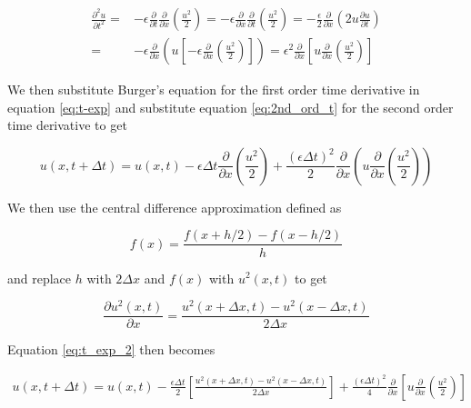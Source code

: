 \documentclass{article}
\begin{document}
\begin{equation}
\begin{split}
	\label{eq:2nd_ord_t}
	\frac{\partial^2 u }{\partial t^2} =& - \epsilon \frac{\partial }{\partial t}\frac{\partial }{\partial x} \left(\frac{u^2}{2} \right)
	= - \epsilon \frac{\partial }{\partial x}\frac{\partial }{\partial t} \left(\frac{u^2}{2} \right)
	= - \frac{\epsilon}{2} \frac{\partial }{\partial x}\left( 2u\frac{\partial u}{\partial t} \right)
	\\ =& - \epsilon \frac{\partial }{\partial x} \left( u \left[ -\epsilon \frac{\partial }{\partial x} \left(\frac{u^2}{2} \right) \right] \right)
	= \epsilon^2 \frac{\partial}{\partial x} \left[u \frac{\partial}{\partial x}\left( \frac{u^2}{2}\right) \right]
\end{split}
\end{equation}

We then substitute Burger's equation for the first order time derivative in equation \ref{eq:t-exp} and substitute equation \ref{eq:2nd_ord_t} for the second order time derivative to get

\begin{equation}
	\label{eq:t_exp_2}
	u(x,t+\Delta t) = u(x,t) - \epsilon \Delta t \frac{\partial }{\partial x} \left(\frac{u^2}{2}\right) + \frac{(\epsilon\Delta t)^2}{2}\frac{\partial}{\partial x }\left(u\frac{\partial}{\partial x}\left(\frac{u^2}{2}\right) \right)
\end{equation}

We then use the central difference approximation defined as 

\begin{equation}
	f(x) = \frac{f(x+h/2) - f(x-h/2)}{h}
\end{equation}

and replace $h$ with $2\Delta x$ and $f(x)$ with $u^2(x,t)$ to get 

\begin{equation}
	\frac{\partial u^2(x,t)}{\partial x} = \frac{u^2(x+\Delta x, t) - u^2(x-\Delta x, t)}{2\Delta x}
\end{equation}

Equation \ref{eq:t_exp_2} then becomes

\begin{equation}
\begin{split}
	\label{eq:t_exp_3}
	u(x,t+\Delta t) = u(x,t) - \frac{\epsilon \Delta t}{2} \left[ \frac{u^2(x+\Delta x, t) - u^2(x-\Delta x, t)}{2\Delta x} \right] + \frac{(\epsilon\Delta t)^2}{4}\frac{\partial}{\partial x }\left[u\frac{\partial}{\partial x}\left(\frac{u^2}{2}\right) \right]
\end{split}
\end{equation}
\end{document}
